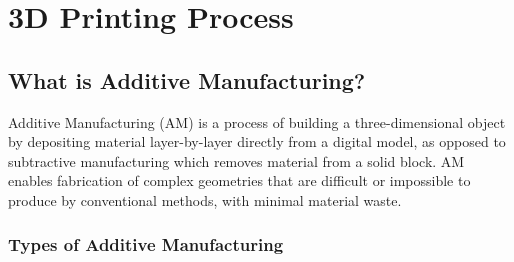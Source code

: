 \documentclass[12pt, a4paper]{article}
\begin{document}
\newpage
\tableofcontents
\newpage

\setcounter{page}{1}

\section{3D Printing Process}

\subsection{What is Additive Manufacturing?}

Additive Manufacturing (AM) is a process of building a three-dimensional object
by depositing material layer-by-layer directly from a digital model, as opposed
to subtractive manufacturing which removes material from a solid block. AM
enables fabrication of complex geometries that are difficult or impossible to
produce by conventional methods, with minimal material waste.

\subsubsection{Types of Additive Manufacturing}
\end{document}
